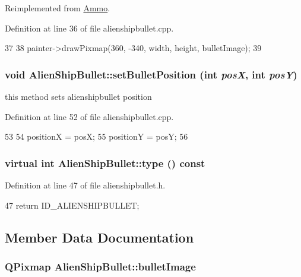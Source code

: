 Reimplemented from \hyperlink{class_ammo_a3f4c8157fab369e46bac4bb88348d8c1}{Ammo}.

Definition at line 36 of file alienshipbullet.cpp.


\begin{DoxyCode}
37 {
38     painter->drawPixmap(360, -340, width, height, bulletImage);
39 }
\end{DoxyCode}
\hypertarget{class_alien_ship_bullet_ad00b6010d2f96d497bc796067aae428b}{
\subsubsection[{setBulletPosition}]{\setlength{\rightskip}{0pt plus 5cm}void AlienShipBullet::setBulletPosition (int {\em posX}, \/  int {\em posY})}}
\label{class_alien_ship_bullet_ad00b6010d2f96d497bc796067aae428b}
this method sets alienshipbullet position 

Definition at line 52 of file alienshipbullet.cpp.


\begin{DoxyCode}
53 {
54     positionX = posX;
55     positionY = posY;
56 }
\end{DoxyCode}
\hypertarget{class_alien_ship_bullet_ab12e8a371cf9565051a3f6e9d7fb54b5}{
\subsubsection[{type}]{\setlength{\rightskip}{0pt plus 5cm}virtual int AlienShipBullet::type () const}}
\label{class_alien_ship_bullet_ab12e8a371cf9565051a3f6e9d7fb54b5}


Definition at line 47 of file alienshipbullet.h.


\begin{DoxyCode}
47 {return ID_ALIENSHIPBULLET;}
\end{DoxyCode}


\subsection{Member Data Documentation}
\hypertarget{class_alien_ship_bullet_a5a21112fe510acd6175c2c8b71af0f93}{
\subsubsection[{bulletImage}]{\setlength{\rightskip}{0pt plus 5cm}QPixmap {\bf AlienShipBullet::bulletImage}}}
\label{class_alien_ship_bullet_a5a21112fe510acd6175c2c8b71af0f93}


